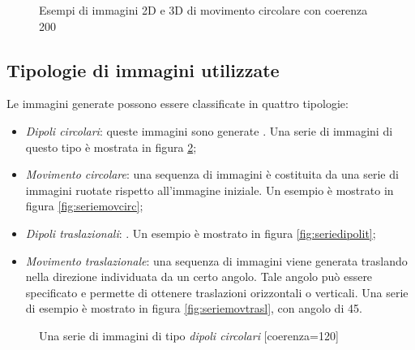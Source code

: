 \begin{figure}
	\centering
	\hfill
	\hfill
	\caption{Esempi di immagini 2D e 3D di movimento circolare con coerenza 200}
	\label{fig:2d3d}
\end{figure}

\subsection{Tipologie di immagini utilizzate}

Le immagini generate possono essere classificate in quattro tipologie:
\begin{itemize}
	\item \textit{Dipoli circolari}: queste immagini sono generate . Una serie di immagini di questo tipo è mostrata in figura \ref{fig:seriedipolic};
	\item \textit{Movimento circolare}: una sequenza di immagini è costituita da una serie di immagini ruotate rispetto all'immagine iniziale. Un esempio è mostrato in figura \ref{fig:seriemovcirc};
	\item \textit{Dipoli traslazionali}: . Un esempio è mostrato in figura \ref{fig:seriedipolit}; 
	\item \textit{Movimento traslazionale}: una sequenza di immagini viene generata traslando nella direzione individuata da un certo angolo. Tale angolo può essere specificato e permette di ottenere traslazioni orizzontali o verticali. Una serie di esempio è mostrato in figura \ref{fig:seriemovtrasl}, con angolo di 45\textdegree.
\end{itemize}

\begin{figure}
	\centering
	\hfill
	\hfill
	\hfill
	\hfill
	\caption{Una serie di immagini di tipo \textit{dipoli circolari} [coerenza=120]}
	\label{fig:seriedipolic}
\end{figure}

